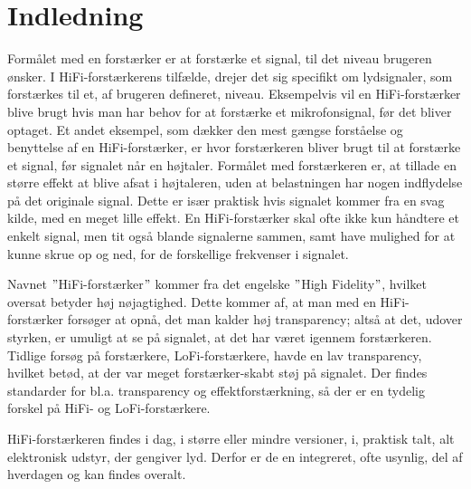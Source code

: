 \chapter{Indledning}
\label{indledning}
Formålet med en forstærker er at forstærke et signal, til det niveau brugeren ønsker. I HiFi-forstærkerens tilfælde, drejer det sig specifikt om lydsignaler, som forstærkes til et, af brugeren defineret, niveau. Eksempelvis vil en HiFi-forstærker blive brugt hvis man har behov for at forstærke et mikrofonsignal, før det bliver optaget. Et andet eksempel, som dækker den mest gængse forståelse og benyttelse af en HiFi-forstærker, er hvor forstærkeren bliver brugt til at forstærke et signal, før signalet når en højtaler. Formålet med forstærkeren er, at tillade en større effekt at blive afsat i højtaleren, uden at belastningen har nogen indflydelse på det originale signal. Dette er især praktisk hvis signalet kommer fra en svag kilde, med en meget lille effekt. En HiFi-forstærker skal ofte ikke kun håndtere et enkelt signal, men tit også blande signalerne sammen, samt have mulighed for at kunne skrue op og ned, for de forskellige frekvenser i signalet. 

Navnet $"$HiFi-forstærker$"$ kommer fra det engelske $"$High Fidelity$"$, hvilket oversat betyder høj nøjagtighed. Dette kommer af, at man med en HiFi-forstærker forsøger at opnå, det man kalder høj transparency; altså at det, udover styrken, er umuligt at se på signalet, at det har været igennem forstærkeren. Tidlige forsøg på forstærkere, LoFi-forstærkere, havde en lav transparency, hvilket betød, at der var meget forstærker-skabt støj på signalet. Der findes standarder for bl.a. transparency og effektforstærkning, så der er en tydelig forskel på HiFi- og LoFi-forstærkere.

HiFi-forstærkeren findes i dag, i større eller mindre versioner, i, praktisk talt, alt elektronisk udstyr, der gengiver lyd. Derfor er de en integreret, ofte usynlig, del af hverdagen og kan findes overalt.